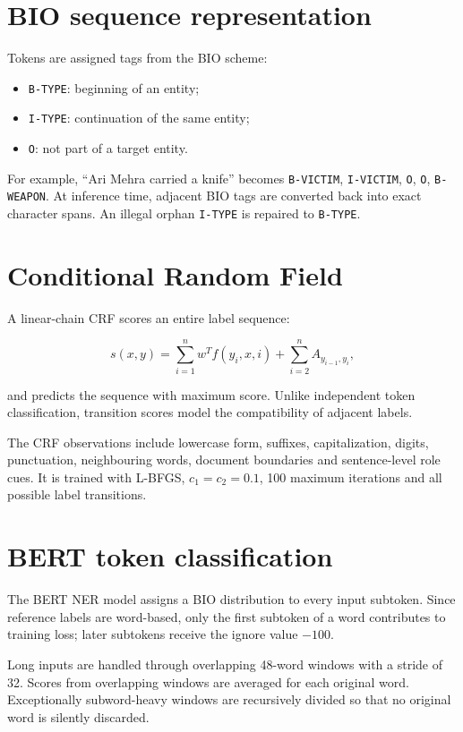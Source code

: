 \documentclass[12pt,a4paper]{report}
\newcommand{\code}[1]{\texttt{#1}}
\begin{document}
\section{BIO sequence representation}

Tokens are assigned tags from the BIO scheme:

\begin{itemize}
  \item \code{B-TYPE}: beginning of an entity;
  \item \code{I-TYPE}: continuation of the same entity;
  \item \code{O}: not part of a target entity.
\end{itemize}

For example, ``Ari Mehra carried a knife'' becomes \code{B-VICTIM}, \code{I-VICTIM}, \code{O}, \code{O}, \code{B-WEAPON}. At inference time, adjacent BIO tags are converted back into exact character spans. An illegal orphan \code{I-TYPE} is repaired to \code{B-TYPE}.

\section{Conditional Random Field}

A linear-chain CRF scores an entire label sequence:

\begin{equation}
s(x,y)=\sum_{i=1}^{n}w^Tf(y_i,x,i)+\sum_{i=2}^{n}A_{y_{i-1},y_i},
\end{equation}

and predicts the sequence with maximum score. Unlike independent token classification, transition scores model the compatibility of adjacent labels.

The CRF observations include lowercase form, suffixes, capitalization, digits, punctuation, neighbouring words, document boundaries and sentence-level role cues. It is trained with L-BFGS, $c_1=c_2=0.1$, 100 maximum iterations and all possible label transitions.

\section{BERT token classification}

The BERT NER model assigns a BIO distribution to every input subtoken. Since reference labels are word-based, only the first subtoken of a word contributes to training loss; later subtokens receive the ignore value $-100$.

Long inputs are handled through overlapping 48-word windows with a stride of 32. Scores from overlapping windows are averaged for each original word. Exceptionally subword-heavy windows are recursively divided so that no original word is silently discarded.
\end{document}
